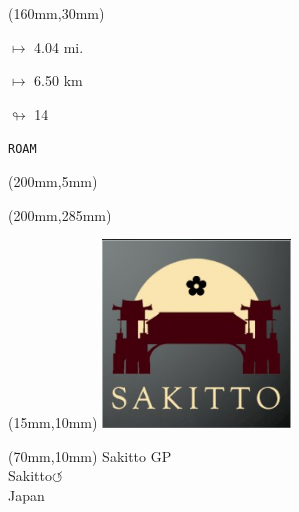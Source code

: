 \begin{textblock*}{40mm}(160mm,30mm)%
\Large
\par$\mapsto$ 4.04 mi.
\par$\mapsto$ 6.50 km
\par$\looparrowright$ 14
\par\hfill\tiny\tt ROAM\\
\end{textblock*}
\begin{textblock*}{20mm}(200mm,5mm)%
\fbox{\thepage}
\label{ROAM}
\end{textblock*}
\begin{textblock*}{20mm}(200mm,285mm)%
\fbox{\thepage}
\end{textblock*}

\null\newpage
\begin{textblock*}{50mm}(15mm,10mm)%
\includegraphics[width=50mm]{LG/2015-05-20_00093.png}
\end{textblock*}
\begin{textblock*}{130mm}(70mm,10mm)%
{\fontsize{20}{20}\selectfont Sakitto GP\\}
{\fontsize{16}{16}\selectfont Sakitto\hfill \huge$\circlearrowleft$\\}
{\fontsize{12}{12}\selectfont Japan\\}
\end{textblock*}
